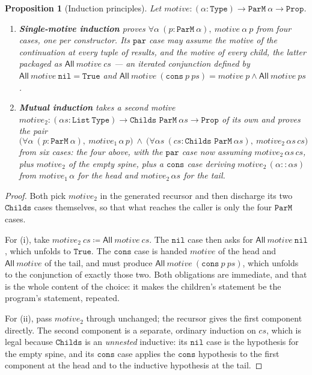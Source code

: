 \documentclass[11pt,a4paper]{article}
\theoremstyle{definition}
\theoremstyle{plain}
\newtheorem{proposition}[definition]{Proposition}
\theoremstyle{remark}
\newcommand{\PM}{\texttt{ParM}}
\begin{document}
\begin{proposition}[Induction principles]\label{prop:induction}
Let $\mathit{motive} : (\alpha : \mathtt{Type}) \to \PM\ \alpha \to \mathtt{Prop}$.
\begin{enumerate}[label=(\roman*),leftmargin=2.2em,itemsep=2pt]
\item \textbf{Single-motive induction} proves
$\forall \alpha\ (p : \PM\ \alpha),\ \mathit{motive}\ \alpha\ p$ from four cases, one per
constructor. Its $\texttt{par}$ case may assume the motive of the continuation at every
tuple of results, and the motive of every child, the latter packaged as
$\mathsf{All}\ \mathit{motive}\ cs$ --- an iterated conjunction defined by
$\mathsf{All}\ \mathit{motive}\ \texttt{nil} = \mathtt{True}$ and
$\mathsf{All}\ \mathit{motive}\ (\texttt{cons}\ p\ ps) =
 \mathit{motive}\ p \wedge \mathsf{All}\ \mathit{motive}\ ps$.
\item \textbf{Mutual induction} takes a second motive
$\mathit{motive}_2 : (\alpha s : \mathtt{List\ Type}) \to \texttt{Childs ParM}\ \alpha s \to \mathtt{Prop}$
of its own and proves the \emph{pair}
\[
  \bigl(\forall \alpha\ (p : \PM\ \alpha),\ \mathit{motive}_1\,\alpha\,p\bigr) \ \wedge\
  \bigl(\forall \alpha s\ (cs : \texttt{Childs ParM}\ \alpha s),\ \mathit{motive}_2\,\alpha s\,cs\bigr)
\]
from six cases: the four above, with the $\texttt{par}$ case now assuming
$\mathit{motive}_2\,\alpha s\,cs$, plus $\mathit{motive}_2$ of the empty spine, plus a
$\texttt{cons}$ case deriving $\mathit{motive}_2\,(\alpha :: \alpha s)$ from
$\mathit{motive}_1\,\alpha$ for the head and $\mathit{motive}_2\,\alpha s$ for the tail.
\end{enumerate}
\end{proposition}

\begin{proof}
Both pick $\mathit{motive}_2$ in the generated recursor and then discharge its two
$\texttt{Childs}$ cases themselves, so that what reaches the caller is only the four $\PM$
cases.

For (i), take $\mathit{motive}_2\ cs \coloneqq \mathsf{All}\ \mathit{motive}\ cs$. The
$\texttt{nil}$ case then asks for $\mathsf{All}\ \mathit{motive}\ \texttt{nil}$, which
unfolds to $\mathtt{True}$. The $\texttt{cons}$ case is handed $\mathit{motive}$ of the head
and $\mathsf{All}\ \mathit{motive}$ of the tail, and must produce
$\mathsf{All}\ \mathit{motive}\ (\texttt{cons}\ p\ ps)$, which unfolds to the conjunction of
exactly those two. Both obligations are immediate, and that is the whole content of the
choice: it makes the children's statement be the program's statement, repeated.

For (ii), pass $\mathit{motive}_2$ through unchanged; the recursor gives the first component
directly. The second component is a separate, ordinary induction on $cs$, which is legal
because $\texttt{Childs}$ is an \emph{unnested} inductive: its $\texttt{nil}$ case is the
hypothesis for the empty spine, and its $\texttt{cons}$ case applies the $\texttt{cons}$
hypothesis to the first component at the head and to the inductive hypothesis at the tail.
\end{proof}
\end{document}
